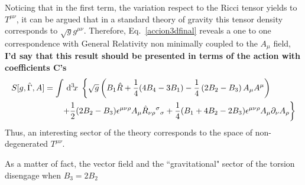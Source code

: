 \documentclass[twocolumn,
  showpacs,showkeys,prd,superscriptaddress]{revtex4-1}
\def\l{\left}
\def\r{\right}
\newcommand{\hl}[1]{{\color{red} \textbf{#1}}}
\begin{document}
Noticing that in  the first term, the variation respect to the Ricci tensor yields to $T^{\mu\nu}$, it can be argued that in a standard theory of gravity this tensor density corresponds to $\sqrt{g}g^{\mu\nu}$.
Therefore, Eq.~\eqref{accion3dfinal} reveals a one to one correspondence with General Relativity non minimally coupled to the $A_\mu$ field, \hl{I'd say that this result should be presented in terms of the action with coefficients C's}
\begin{equation}
  \label{accion3dGR}
  \begin{split}
    S[g,\hat\Gamma,A]&=
    \int\dn{3}{x} \l\{\sqrt{g}\l(B_1\hat R +\frac{1}{4}(4B_4-3B_1) -\frac{1}{4}\l( 2B_2-B_3\r) A_\mu A^\mu\r)\r.\\
    & \qquad \l.+\frac{1}{2}(2B_2-B_3)\epsilon^{\mu\nu\rho}A_\mu\hat R_{\nu\rho}{}^{\sigma}{}_\sigma+\frac{1}{4}(B_1+4B_2-2B_3)\epsilon^{\mu\nu\rho}A_\mu\partial_\nu A_\rho\r\}
  \end{split}
\end{equation}
Thus, an interesting sector of the theory corresponds to the space of non-degenerated $T^{\mu\nu}$. 

As a matter of fact, the vector field and the ``gravitational" sector of the torsion disengage when $B_3=2B_2$

\end{document}
